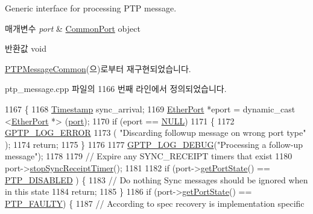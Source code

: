 Generic interface for processing P\+TP message. 


\begin{DoxyParams}{매개변수}
{\em port} & \hyperlink{class_common_port}{Common\+Port} object \\
\hline
\end{DoxyParams}
\begin{DoxyReturn}{반환값}
void 
\end{DoxyReturn}


\hyperlink{class_p_t_p_message_common_a45670a42f5684252d52543f9ed3a1551}{P\+T\+P\+Message\+Common}(으)로부터 재구현되었습니다.



ptp\+\_\+message.\+cpp 파일의 1166 번째 라인에서 정의되었습니다.


\begin{DoxyCode}
1167 \{
1168     \hyperlink{class_timestamp}{Timestamp} sync\_arrival;
1169     \hyperlink{class_ether_port}{EtherPort} *eport = dynamic\_cast <\hyperlink{class_ether_port}{EtherPort} *> (\hyperlink{gst__avb__playbin_8c_a63c89c04d1feae07ca35558055155ffb}{port});
1170     \textcolor{keywordflow}{if} (eport == \hyperlink{openavb__types__base__pub_8h_a070d2ce7b6bb7e5c05602aa8c308d0c4}{NULL})
1171     \{
1172         \hyperlink{gptp__log_8hpp_afefbb1009717c128012bfeed94842987}{GPTP\_LOG\_ERROR}
1173             ( \textcolor{stringliteral}{"Discarding followup message on wrong port type"} );
1174         \textcolor{keywordflow}{return};
1175     \}
1176 
1177     \hyperlink{gptp__log_8hpp_ae4c6efe7c9cf6d7d3bbd28a0fd087d61}{GPTP\_LOG\_DEBUG}(\textcolor{stringliteral}{"Processing a follow-up message"});
1178 
1179     \textcolor{comment}{// Expire any SYNC\_RECEIPT timers that exist}
1180     port->\hyperlink{class_common_port_af3b46893f10141406c791c89d3e54b8d}{stopSyncReceiptTimer}();
1181 
1182     \textcolor{keywordflow}{if} (port->\hyperlink{class_common_port_aa4182d914fdb9a27fb875d8495e0289c}{getPortState}() == \hyperlink{ptptypes_8hpp_a679431f1afc75d7bb9e972c022e53672a38f3a091adeb361140c66f2f6dc44df7}{PTP\_DISABLED} ) \{
1183         \textcolor{comment}{// Do nothing Sync messages should be ignored when in this state}
1184         \textcolor{keywordflow}{return};
1185     \}
1186     \textcolor{keywordflow}{if} (port->\hyperlink{class_common_port_aa4182d914fdb9a27fb875d8495e0289c}{getPortState}() == \hyperlink{ptptypes_8hpp_a679431f1afc75d7bb9e972c022e53672ac2e47460540ecdcec420be97a0bb9ff2}{PTP\_FAULTY}) \{
1187         \textcolor{comment}{// According to spec recovery is implementation specific}

\end{DoxyCode}
